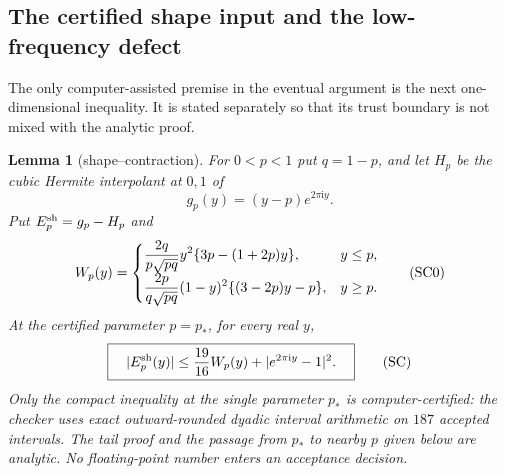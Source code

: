 \documentclass[11pt,a4paper]{article}
\numberwithin{equation}{section}
\newtheorem{lemma}[theorem]{Lemma}
\theoremstyle{definition}
\theoremstyle{remark}
\newcommand{\ii}{\mathrm i}
\begin{document}
\subsection*{The certified shape input and the low-frequency defect}

The only computer-assisted premise in the eventual argument is the next
one-dimensional inequality.  It is stated separately so that its trust
boundary is not mixed with the analytic proof.

\begin{lemma}[shape--contraction]\label{orig:lem:shapecontraction}
For $0<p<1$ put $q=1-p$, and let $H_p$ be the cubic Hermite interpolant at
$0,1$ of
\[
                         g_p(y)=(y-p)e^{2\pi\ii y}.
\]
Put $E_p^{\rm sh}=g_p-H_p$ and
\[
 W_p(y)=
 \begin{cases}
 \displaystyle {2q\over p\sqrt{pq}}y^2
       \{3p-(1+2p)y\},&y\le p,\\[2mm]
 \displaystyle {2p\over q\sqrt{pq}}(1-y)^2
       \{(3-2p)y-p\},&y\ge p.
 \end{cases}                                             \tag{SC0}
\]
At the certified parameter $p=p_*$, for every real $y$,
\[
 \boxed{\quad |E_p^{\rm sh}(y)|
       \le {19\over16}W_p(y)+|e^{2\pi\ii y}-1|^2.\quad} \tag{SC}
\]
Only the compact inequality at the single parameter $p_*$ is
computer-certified: the checker uses exact outward-rounded dyadic interval
arithmetic on $187$ accepted intervals.  The tail proof and the passage from
$p_*$ to nearby $p$ given below are analytic.  No floating-point number
enters an acceptance decision.
\end{lemma}
\end{document}
